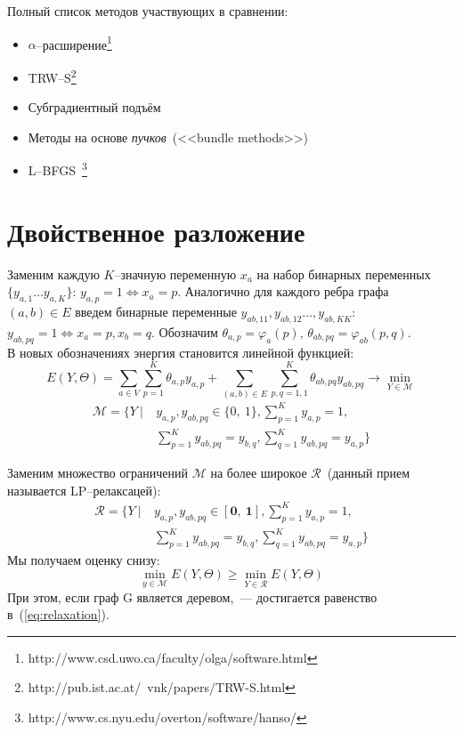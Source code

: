 \documentclass{article}
\begin{document}
Полный список методов участвующих в сравнении:
\begin{itemize}
\item $\alpha$--расширение\footnote{http://www.csd.uwo.ca/faculty/olga/software.html}~\cite{AlphaExp}~\cite{AlphaExp2}~\cite{AlphaExp3}
\item TRW--S\footnote{http://pub.ist.ac.at/~vnk/papers/TRW-S.html}~\cite{TRWS}
\item Субградиентный подъём~\cite{Subgradient}
\item Методы на основе \textit{пучков}~(<<bundle methods>>)~\cite{Bundle}
\item L--BFGS~\footnote{http://www.cs.nyu.edu/overton/software/hanso/}
\end{itemize}

\section{Двойственное разложение}
Заменим каждую $K$--значную переменную $x_a$ на набор бинарных переменных $\{y_{a,1} \dots y_{a,K} \}$: $y_{a,p} = 1 \Leftrightarrow x_a = p$. Аналогично для каждого ребра графа $(a,b) \in E$ введем бинарные переменные $y_{ab,11}, y_{ab,12}\dots, y_{ab,KK}$: $y_{ab,pq} = 1 \Leftrightarrow x_a = p, x_b = q$. Обозначим $\theta_{a,p} = \varphi_{a} (p)$, $\theta_{ab,pq} = \varphi_{ab} (p, q)$.\\
В новых обозначениях энергия становится линейной функцией:
\begin{equation}
  E(Y, \Theta) = \sum_{a \in V} \sum_{p = 1}^{K} \theta_{a,p} y_{a,p} + \sum_{(a,b) \in E} \sum_{p,q = 1,1}^{K} \theta_{ab,pq} y_{ab,pq} \rightarrow \min_{Y \in \mathcal{M}}
\label{eq:main_problem}
\end{equation}
\begin{align*}
  \mathcal{M} = \Bigg \{ Y~|~&y_{a,p}, y_{ab,pq} \in \{0,~1\}, \sum_{p = 1}^{K} y_{a,p} = 1,\\
&\sum_{p = 1}^{K} y_{ab,pq} = y_{b,q}, \sum_{q = 1}^{K} y_{ab,pq} = y_{a,p} \Bigg \}
\end{align*}

Заменим множество ограничений $\mathcal{M}$ на более широкое $\mathcal{R}$~(данный прием называется LP--релаксацей):
\begin{align*}
  \mathcal{R} = \Bigg \{ Y~|~&y_{a,p}, y_{ab,pq} \mathbf{\in [0,~1]}, \sum_{p = 1}^{K} y_{a,p} = 1,\\
&\sum_{p = 1}^{K} y_{ab,pq} = y_{b,q}, \sum_{q = 1}^{K} y_{ab,pq} = y_{a,p} \Bigg \}
\end{align*}
Мы получаем оценку снизу:
\begin{equation}
\min_{y \in \mathcal{M}} E(Y, \Theta) \geq \min_{Y \in \mathcal{R}} E(Y, \Theta)
\label{eq:relaxation}
\end{equation}
При этом, если граф G является деревом,~--- достигается равенство в~(\ref{eq:relaxation}).
\end{document}
